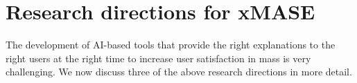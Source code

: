 \documentclass[letterpaper]{article} %
\newcommand{\tim}[1]{\todo[inline, color=yellow!20]{#1}}
\begin{document}








\section{Research directions for \ac{xMASE}}

The development of AI-based tools that provide the right explanations to the right users at the 
right time to increase user satisfaction in \acp{mas} is very challenging. We now discuss three of the above research directions in more detail. 
\end{document}
